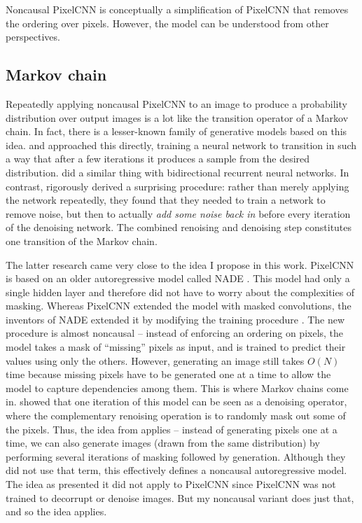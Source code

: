 \documentclass[11pt, a4paper, openany]{book}
\newcommand{\nquote}[1]{``{#1}''}
\begin{document}
Noncausal PixelCNN is conceptually a simplification of PixelCNN that removes the ordering over pixels. However, the model can be understood from other perspectives.

\subsection{Markov chain} \label{markovchain}

Repeatedly applying noncausal PixelCNN to an image to produce a probability distribution over output images is a lot like the transition operator of a Markov chain. In fact, there is a lesser-known family of generative models based on this idea. \citet{denoisingthermo} and \citet{infusion} approached this directly, training a neural network to transition in such a way that after a few iterations it produces a sample from the desired distribution. \citet{brnndenoise} did a similar thing with bidirectional recurrent neural networks. In contrast, \citet{denoisinggenerative} rigorously derived a surprising procedure: rather than merely applying the network repeatedly, they found that they needed to train a network to remove noise, but then to actually \emph{add some noise back in} before every iteration of the denoising network. The combined renoising and denoising step constitutes one transition of the Markov chain.

The latter research came very close to the idea I propose in this work. PixelCNN is based on an older autoregressive model called NADE \citep{nade}. This model had only a single hidden layer and therefore did not have to worry about the complexities of masking. Whereas PixelCNN extended the model with masked convolutions, the inventors of NADE extended it by modifying the training procedure \citep{dnade,cnade}. The new procedure is almost noncausal -- instead of enforcing an ordering on pixels, the model takes a mask of \nquote{missing} pixels as input, and is trained to predict their values using only the others. However, generating an image still takes $O(N)$ time because missing pixels have to be generated one at a time to allow the model to capture dependencies among them. This is where Markov chains come in. \citet{gsnnade} showed that one iteration of this model can be seen as a denoising operator, where the complementary renoising operation is to randomly mask out some of the pixels. Thus, the idea from \citet{denoisinggenerative} applies -- instead of generating pixels one at a time, we can also generate images (drawn from the same distribution) by performing several iterations of masking followed by generation. Although they did not use that term, this effectively defines a noncausal autoregressive model. The idea as \citet{gsnnade} presented it did not apply to PixelCNN since PixelCNN was not trained to decorrupt or denoise images. But my noncausal variant does just that, and so the idea applies.
\end{document}
